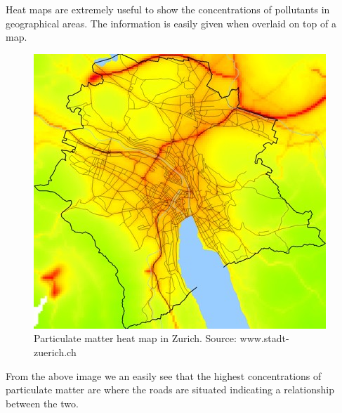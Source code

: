 Heat maps are extremely useful to show the concentrations of pollutants in geographical areas. The information is easily given when overlaid on top of a map.  

\begin{figure}[H]
        \begin{center}
                \includegraphics[scale=0.5]{./images/heatmaps/zurichpm.jpg}
                \caption{Particulate matter heat map in Zurich. Source: www.stadt-zuerich.ch}
        \end{center}
\end{figure}

From the above image we an easily see that the highest concentrations of particulate matter are where the roads are situated indicating a relationship between the two. 




